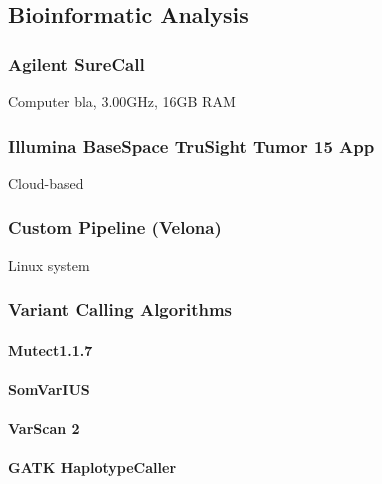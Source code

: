 \subsection{Bioinformatic Analysis}
\subsubsection{Agilent SureCall}
Computer bla, 3.00GHz, 16GB RAM
\subsubsection{Illumina BaseSpace TruSight Tumor 15 App}
Cloud-based
\subsubsection{Custom Pipeline (Velona)}
Linux system
\subsubsection{Variant Calling Algorithms}
\paragraph{Mutect1.1.7}
{\it \citet{Gallant:87}}
\paragraph{SomVarIUS}
\paragraph{VarScan 2}
\paragraph{GATK HaplotypeCaller}
